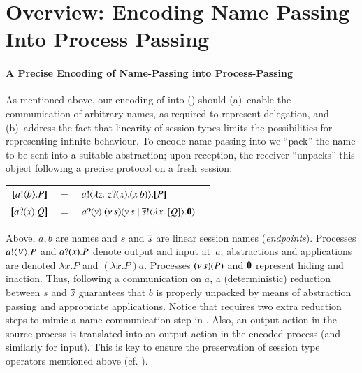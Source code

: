 \documentclass[runningheads]{llncs}
\begin{document}

\section{Overview: Encoding Name Passing Into Process Passing}
\label{sec:overview}
%
\paragraph{A Precise Encoding of Name-Passing into Process-Passing}
As mentioned above, 
our encoding of \HOp into \HO () should 
(a)~enable the communication of arbitrary names, as required to represent delegation,
and 
(b)~address the fact that linearity of session types limits the 
possibilities for representing infinite behaviour. 
To encode name passing into \HO 
we ``pack''
the name to be sent into a suitable abstraction; 
upon reception, the receiver ``unpacks'' this object following a precise protocol on a fresh  session:
\begin{center}
\begin{tabular}{rcll}
  $[\!\![a ! \langle b \rangle . P]\!\!]$	&$=$&	$a ! \langle  \lambda z.\,\,z ? (x) . (x\, {b})  \rangle . [\!\![P]\!\!]$ \\
  $[\!\![a ? (x) . Q]\!\!]$	&$=$&	$a ? (y) . (\nu\, s)(y\, {s} \;|\; \overline{s} ! \langle \lambda x.\,[\!\![Q]\!\!] \rangle . \mathbf{0})$
\end{tabular}
\end{center}
Above, 
$a,b$ are names and $s$ and $\overline{s}$ are 
linear session names (\emph{endpoints}).
Processes $a ! \langle V \rangle . P$ and 
$a ? (x) . P$ denote output and input at~$a$;   
abstractions and applications are denoted
$\lambda x.P$ and $(\lambda x.P)a$. Processes %
$(\nu\, s)(P)$ and $\mathbf{0}$ represent hiding and inaction. %
Thus, following a communication on $a$, %
a (deterministic) reduction between  
$s$ and $\overline{s}$ guarantees that $b$ is properly unpacked by means of abstraction passing
and appropriate applications.
Notice that 
\HO requires two extra reduction steps to mimic a name communication step in \HOp.
Also, an output action in the source process is translated into an output action in the encoded process (and similarly for input).
This is key to ensure the preservation of session type operators mentioned above (cf. ).
\end{document}
